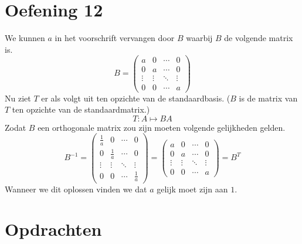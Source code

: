 \documentclass[lineaire_algebra_oplossingen.tex]{subfiles}
\begin{document}
\section{Oefening 12}
We kunnen $a$ in het voorschrift vervangen door $B$ waarbij $B$ de volgende matrix is.
\[
B=
\begin{pmatrix}
a & 0 & \cdots & 0\\
0 & a & \cdots & 0\\
\vdots & \vdots& \ddots & \vdots\\
0 & 0 & \cdots & a
\end{pmatrix}
\]
Nu ziet $T$ er als volgt uit ten opzichte van de standaardbasis. ($B$ is de matrix van $T$ ten opzichte van de standaardmatrix.)
\[
T: A \mapsto BA
\]
Zodat $B$ een orthogonale matrix zou zijn moeten volgende gelijkheden gelden.
\[
B^{-1}=
\begin{pmatrix}
\frac{1}{a} & 0 & \cdots & 0\\
0 & \frac{1}{a} & \cdots & 0\\
\vdots & \vdots& \ddots & \vdots\\
0 & 0 & \cdots & \frac{1}{a}
\end{pmatrix}
=
\begin{pmatrix}
a & 0 & \cdots & 0\\
0 & a & \cdots & 0\\
\vdots & \vdots& \ddots & \vdots\\
0 & 0 & \cdots & a
\end{pmatrix}
= B^T
\]
Wanneer we dit oplossen vinden we dat $a$ gelijk moet zijn aan $1$.

\section{Opdrachten}
\end{document}
